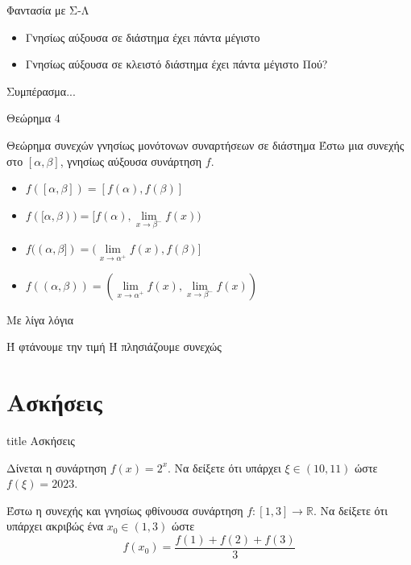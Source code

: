 \documentclass{presentation}
\begin{document}
\begin{frame}{Φαντασία με Σ-Λ}
  \begin{itemize}
    \item<1-> Γνησίως αύξουσα σε διάστημα έχει πάντα μέγιστο
    \item<2-> Γνησίως αύξουσα σε κλειστό διάστημα έχει πάντα μέγιστο  Πού?
  \end{itemize}
  Συμπέρασμα...
\end{frame}

\begin{frame}{Θεώρημα 4}
  \begin{block}{Θεώρημα συνεχών γνησίως μονότονων συναρτήσεων σε διάστημα}
    Έστω μια συνεχής στο $[α,β]$, γνησίως αύξουσα συνάρτηση $f$.
    \begin{itemize}
      \item<1-> $f([α,β])=[f(α),f(β)]$
      \item<2-> $f([α,β))=[f(α),\lim\limits_{x \to β^-}{ f(x) })$
      \item<3-> $f((α,β])=(\lim\limits_{x \to α^+}{ f(x) },f(β)]$
      \item<4-> $f((α,β))=(\lim\limits_{x \to α^+}{ f(x) },\lim\limits_{x \to β^-}{ f(x) })$
    \end{itemize}
  \end{block}
  Με λίγα λόγια

  Ή φτάνουμε την τιμή Ή πλησιάζουμε συνεχώς
\end{frame}


\section{Ασκήσεις}

\begin{frame}[noframenumbering]
  \vfill
  \centering
  \begin{beamercolorbox}[sep=8pt,center,shadow=true,rounded=true]{title}
    Ασκήσεις
  \end{beamercolorbox}
  \vfill
\end{frame}

\begin{askisi}
  Δίνεται η συνάρτηση $f(x)=2^x$. Να δείξετε ότι υπάρχει $ξ\in (10,11)$ ώστε $f(ξ)=2023$.

  \hyperlink{Λύση1}{}
\end{askisi}

\begin{askisi}
  Έστω η συνεχής και γνησίως φθίνουσα συνάρτηση $f:[1,3]\to\mathbb{R}$. Να δείξετε ότι υπάρχει ακριβώς ένα $x_0\in (1,3)$ ώστε
  $$f(x_0)=\frac{f(1)+f(2)+f(3)}{3}$$

  \hyperlink{Λύση2}{}
\end{askisi}
\end{document}
